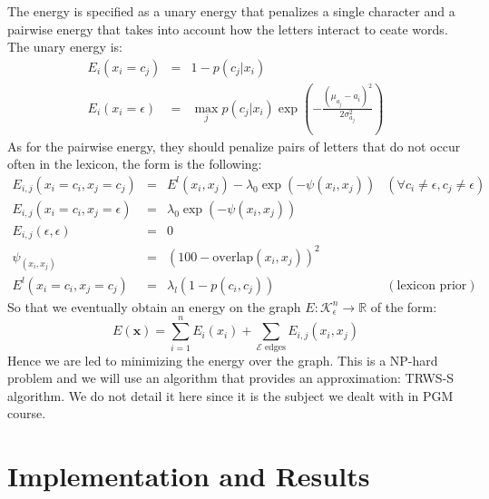 \documentclass[10pt,a4paper]{article}
\begin{document}
The energy is specified as a unary energy that penalizes a single character and a pairwise energy that takes into account how the letters interact to ceate words. The unary energy is: 
\begin{equation}
\begin{array}{rll}
E_i(x_i = c_j) & = & \displaystyle 1 - p(c_j|x_i) \\
E_i(x_i = \epsilon)	& = & \displaystyle \max_j p(c_j |x_i) \exp\left( - \frac{(\mu_{a_j} - a_i)^2}{2\sigma^2_{a_j}} \right)
\end{array}
\label{eq:}
\end{equation}
As for the pairwise energy, they should penalize pairs of letters that do not occur often in the lexicon, the form is the following:
\begin{equation}
\begin{array}{rlll}
E_{i,j}(x_i = c_i,x_j = c_j) 			& = & \displaystyle E^l(x_i,x_j) - \lambda_0\exp\left( - \psi(x_i,x_j) \right) 	& (\forall c_i \neq \epsilon, c_j \neq \epsilon) \\
E_{i,j}(x_i = c_i,x_j = \epsilon) & = & \displaystyle \lambda_0\exp\left( - \psi(x_i,x_j) \right) 								& \\
E_{i,j}(\epsilon, \epsilon) 			& = & \displaystyle 0 																													& \\
\psi_(x_i,x_j) 										& = & \displaystyle (100 - \text{overlap}(x_i,x_j))^2 													& \\
E^l(x_i = c_i,x_j = c_j)					& = & \displaystyle \lambda_l(1 - p(c_i,c_j)) 																	& (\text{lexicon prior})
\end{array}
\label{eq:pairwiseEnergy}
\end{equation}
So that we eventually obtain an energy on the graph $E:\mathcal{K}_{\epsilon}^n \rightarrow \mathbb{R}$ of the form:
\begin{equation}
E(\mathbf{x})	= \sum_{i=1}^n E_i(x_i) + \sum_{\mathcal{E} \text{ edges}} E_{i,j}(x_i,x_j)
\label{eq:}
\end{equation}
Hence we are led to minimizing the energy over the graph. This is a NP-hard problem and we will use an algorithm that provides an approximation: TRWS-S algorithm. We do not detail it here since it is the subject we dealt with in PGM course.





\section{Implementation and Results}
\end{document}
